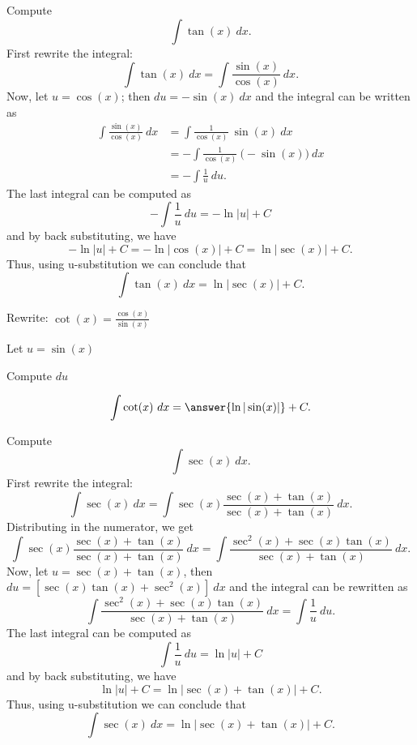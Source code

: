 \documentclass{ximera}
\begin{document}
\begin{example} Compute 
\[\int \tan(x) \ dx.\]
First rewrite the integral:
\[\int \tan(x) \ dx =\int \frac{\sin(x)}{\cos(x)} \ dx.\]
Now, let $u = \cos(x)$; then $du = -\sin(x) \ dx$
and the integral can be written as
\begin{align*}
\int \frac{\sin(x)}{\cos(x)} \ dx &= \int \frac{1}{\cos(x)}\ \sin(x) \  dx \\
 &=  - \int \frac{1}{\cos(x)}\ \big(-\sin(x)\big) \  dx\\
&=-\int \frac{1}{u} \ du.
\end{align*}
The last integral can be computed as 
\[-\int \frac{1}{u} \ du = -\ln|u| + C\]
and by back substituting, we have 
\[-\ln|u| + C = -\ln|\cos(x)| + C = \ln|\sec(x)| +C.\]
Thus, using u-substitution we can conclude that
\[\int \tan(x) \ dx =  \ln|\sec(x)| + C.\]
\end{example}

\begin{problem}
\begin{hint}
Rewrite: $\cot(x) = \frac{\cos(x)}{\sin(x)}$
\end{hint}
\begin{hint}
Let $u = \sin(x)$
\end{hint}
\begin{hint}
Compute $du$
\end{hint}
\[\int \cot(x) \ dx = \answer{\ln|\sin(x)|} +C.\]


\end{problem}


\begin{example} Compute 
\[\int \sec(x) \ dx.\]
First rewrite the integral:
\[\int \sec(x) \ dx =\int \sec(x)\frac{\sec(x)+\tan(x)}{\sec(x)+\tan(x)} \ dx.\]
Distributing in the numerator, we get
\[\int \sec(x)\frac{\sec(x)+\tan(x)}{\sec(x)+\tan(x)} \ dx = \int \frac{\sec^2(x)+\sec(x)\tan(x)}{\sec(x)+\tan(x)} \ dx.\]
Now, let $u = \sec(x) + \tan(x)$, then $du = [\sec(x)\tan(x) + \sec^2(x)] \ dx$ and the integral can be rewritten as
\[ \int \frac{\sec^2(x)+\sec(x)\tan(x)}{\sec(x)+\tan(x)} \ dx = \int \frac{1}{u} \ du.\]
The last integral can be computed as
\[\int \frac{1}{u} \ du = \ln|u| + C\]
and by back substituting, we have 
\[\ln|u| + C = \ln|\sec(x) + \tan(x)| + C.\]
Thus, using u-substitution we can conclude that
\[\int \sec(x) \ dx =  \ln|\sec(x) + \tan(x)| + C.\]
\end{example}


\begin{center}
\begin{foldable}
\end{foldable}
\end{center}
\end{document}
